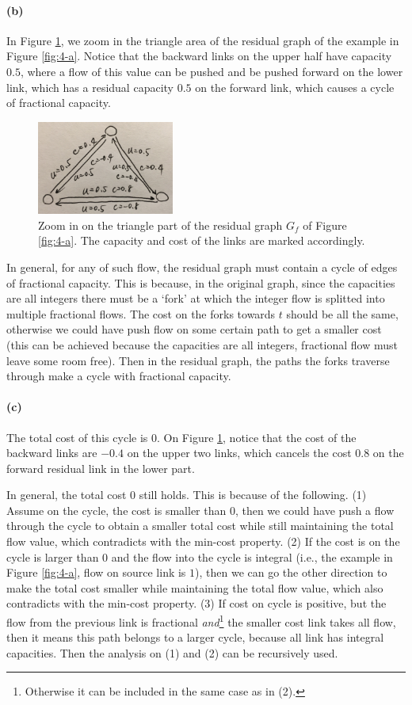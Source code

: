 \documentclass[12pt]{article}
\begin{document}
\paragraph{(b)} In Figure \ref{fig:4-b}, we zoom in the triangle area of the residual graph of the example in Figure \ref{fig:4-a}. Notice that the backward links on the upper half have capacity $0.5$, where a flow of this value can be pushed and be pushed forward on the lower link, which has a residual capacity $0.5$ on the forward link, which causes a cycle of fractional capacity. 
\begin{figure}[h!]
	\centering
	\includegraphics[width=0.4\textwidth]{4-b.jpg}
	\caption{Zoom in on the triangle part of the residual graph $G_f$ of Figure \ref{fig:4-a}. The capacity and cost of the links are marked accordingly.}
	\label{fig:4-b}
\end{figure}

In general, for any of such flow, the residual graph must contain a cycle of edges of fractional capacity. This is because, in the original graph, since the capacities are all integers there must be a `fork' at which the integer flow is splitted into multiple fractional flows. The cost on the forks towards $t$ should be all the same, otherwise we could have push flow on some certain path to get a smaller cost (this can be achieved because the capacities are all integers, fractional flow must leave some room free). Then in the residual graph, the paths the forks traverse through make a cycle with fractional capacity.
\paragraph{(c)} The total cost of this cycle is 0. On Figure \ref{fig:4-b}, notice that the cost of the backward links are $-0.4$ on the upper two links, which cancels the cost $0.8$ on the forward residual link in the lower part. 

In general, the total cost $0$ still holds. This is because of the following. (1) Assume on the cycle, the cost is smaller than $0$, then we could have push a flow through the cycle to obtain a smaller total cost while still maintaining the total flow value, which contradicts with the min-cost property. (2) If the cost is on the cycle is larger than $0$ and the flow into the cycle is integral (i.e., the example in Figure \ref{fig:4-a}, flow on source link is $1$), then we can go the other direction to make the total cost smaller while maintaining the total flow value, which also contradicts with the min-cost property. (3) If cost on cycle is positive, but the flow from the previous link is fractional \emph{and}\footnote{Otherwise it can be included in the same case as in (2).} the smaller cost link takes all flow, then it means this path belongs to a larger cycle, because all link has integral capacities. Then the analysis on (1) and (2) can be recursively used. 
\end{document}
